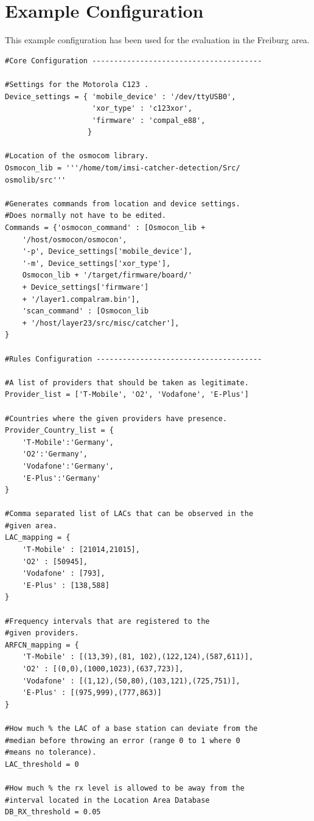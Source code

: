 \section{Example Configuration}
\label{sec:example_config}
This example configuration has been used for the evaluation in the Freiburg area.
\begin{lstlisting}
#Core Configuration ---------------------------------------

#Settings for the Motorola C123 .
Device_settings = { 'mobile_device' : '/dev/ttyUSB0',
                    'xor_type' : 'c123xor',
                    'firmware' : 'compal_e88',
                   }

#Location of the osmocom library.
Osmocon_lib = '''/home/tom/imsi-catcher-detection/Src/
osmolib/src'''

#Generates commands from location and device settings.
#Does normally not have to be edited.
Commands = {'osmocon_command' : [Osmocon_lib + 
    '/host/osmocon/osmocon', 
    '-p', Device_settings['mobile_device'], 
    '-m', Device_settings['xor_type'], 
    Osmocon_lib + '/target/firmware/board/' 
    + Device_settings['firmware']
    + '/layer1.compalram.bin'],
    'scan_command' : [Osmocon_lib 
    + '/host/layer23/src/misc/catcher'],
}

#Rules Configuration --------------------------------------

#A list of providers that should be taken as legitimate.
Provider_list = ['T-Mobile', 'O2', 'Vodafone', 'E-Plus']

#Countries where the given providers have presence.
Provider_Country_list = {
    'T-Mobile':'Germany',
    'O2':'Germany',
    'Vodafone':'Germany',
    'E-Plus':'Germany'
}

#Comma separated list of LACs that can be observed in the
#given area.
LAC_mapping = {
    'T-Mobile' : [21014,21015],
    'O2' : [50945],
    'Vodafone' : [793],
    'E-Plus' : [138,588]
}

#Frequency intervals that are registered to the 
#given providers.
ARFCN_mapping = {
    'T-Mobile' : [(13,39),(81, 102),(122,124),(587,611)],
    'O2' : [(0,0),(1000,1023),(637,723)],
    'Vodafone' : [(1,12),(50,80),(103,121),(725,751)],
    'E-Plus' : [(975,999),(777,863)]
}

#How much % the LAC of a base station can deviate from the
#median before throwing an error (range 0 to 1 where 0 
#means no tolerance).
LAC_threshold = 0

#How much % the rx level is allowed to be away from the
#interval located in the Location Area Database
DB_RX_threshold = 0.05


\end{lstlisting}
